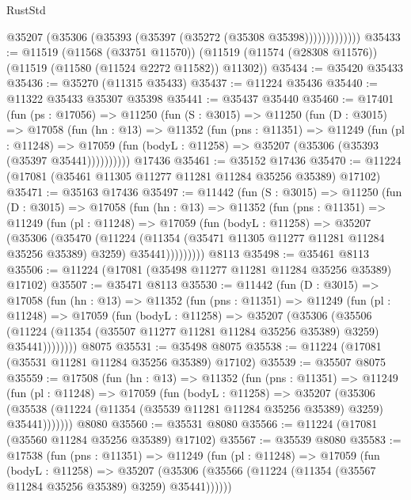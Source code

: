 \begin{lexlean}{RustStd}
\begin{coremodule}
                  @35207 (@35306 (@35393 (@35397 (@35272 (@35308 @35398)))))))))))))
@35433 := @11519
    (@11568 (@33751 @11570))
    (@11519 (@11574 (@28308 @11576)) (@11519 (@11580 (@11524 @2272 @11582)) @11302))
@35434 := @35420 @35433
@35436 := @35270 (@11315 @35433)
@35437 := @11224 @35436
@35440 := @11322 @35433 @35307 @35398
@35441 := @35437 @35440
@35460 := @17401
    (fun (ps : @17056) =>
    @11250
      (fun (S : @3015) =>
      @11250
        (fun (D : @3015) =>
        @17058
          (fun (hn : @13) =>
          @11352
            (fun (pns : @11351) =>
            @11249
              (fun (pl : @11248) =>
              @17059 (fun (bodyL : @11258) => @35207 (@35306 (@35393 (@35397 @35441))))))))))
    @17436
@35461 := @35152 @17436
@35470 := @11224 (@17081 (@35461 @11305 @11277 @11281 @11284 @35256 @35389) @17102)
@35471 := @35163 @17436
@35497 := @11442
    (fun (S : @3015) =>
    @11250
      (fun (D : @3015) =>
      @17058
        (fun (hn : @13) =>
        @11352
          (fun (pns : @11351) =>
          @11249
            (fun (pl : @11248) =>
            @17059
              (fun (bodyL : @11258) =>
              @35207
                (@35306
                  (@35470
                    (@11224
                      (@11354 (@35471 @11305 @11277 @11281 @11284 @35256 @35389) @3259)
                      @35441)))))))))
    @8113
@35498 := @35461 @8113
@35506 := @11224 (@17081 (@35498 @11277 @11281 @11284 @35256 @35389) @17102)
@35507 := @35471 @8113
@35530 := @11442
    (fun (D : @3015) =>
    @17058
      (fun (hn : @13) =>
      @11352
        (fun (pns : @11351) =>
        @11249
          (fun (pl : @11248) =>
          @17059
            (fun (bodyL : @11258) =>
            @35207
              (@35306
                (@35506
                  (@11224 (@11354 (@35507 @11277 @11281 @11284 @35256 @35389) @3259) @35441))))))))
    @8075
@35531 := @35498 @8075
@35538 := @11224 (@17081 (@35531 @11281 @11284 @35256 @35389) @17102)
@35539 := @35507 @8075
@35559 := @17508
    (fun (hn : @13) =>
    @11352
      (fun (pns : @11351) =>
      @11249
        (fun (pl : @11248) =>
        @17059
          (fun (bodyL : @11258) =>
          @35207
            (@35306
              (@35538 (@11224 (@11354 (@35539 @11281 @11284 @35256 @35389) @3259) @35441)))))))
    @8080
@35560 := @35531 @8080
@35566 := @11224 (@17081 (@35560 @11284 @35256 @35389) @17102)
@35567 := @35539 @8080
@35583 := @17538
    (fun (pns : @11351) =>
    @11249
      (fun (pl : @11248) =>
      @17059
        (fun (bodyL : @11258) =>
        @35207 (@35306 (@35566 (@11224 (@11354 (@35567 @11284 @35256 @35389) @3259) @35441))))))

\end{coremodule}
\end{lexlean}
